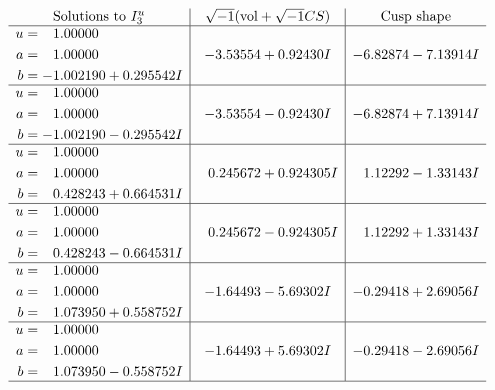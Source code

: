 \documentclass[1p]{elsarticle_modified}
\theoremstyle{definition}
\newcommand{\I}{\sqrt{-1}}
\begin{document}
$$\begin{array}{c|c|c}  
\text{Solutions to }I^u_{3}& \I (\text{vol} + \sqrt{-1}CS) & \text{Cusp shape}\\
 \hline 
\begin{aligned}
u &= \phantom{-}1.00000\phantom{ +0.000000I} \\
a &= \phantom{-}1.00000\phantom{ +0.000000I} \\
b &= -1.002190 + 0.295542 I\end{aligned}
 & -3.53554 + 0.92430 I & -6.82874 - 7.13914 I \\ \hline\begin{aligned}
u &= \phantom{-}1.00000\phantom{ +0.000000I} \\
a &= \phantom{-}1.00000\phantom{ +0.000000I} \\
b &= -1.002190 - 0.295542 I\end{aligned}
 & -3.53554 - 0.92430 I & -6.82874 + 7.13914 I \\ \hline\begin{aligned}
u &= \phantom{-}1.00000\phantom{ +0.000000I} \\
a &= \phantom{-}1.00000\phantom{ +0.000000I} \\
b &= \phantom{-}0.428243 + 0.664531 I\end{aligned}
 & \phantom{-}0.245672 + 0.924305 I & \phantom{-}1.12292 - 1.33143 I \\ \hline\begin{aligned}
u &= \phantom{-}1.00000\phantom{ +0.000000I} \\
a &= \phantom{-}1.00000\phantom{ +0.000000I} \\
b &= \phantom{-}0.428243 - 0.664531 I\end{aligned}
 & \phantom{-}0.245672 - 0.924305 I & \phantom{-}1.12292 + 1.33143 I \\ \hline\begin{aligned}
u &= \phantom{-}1.00000\phantom{ +0.000000I} \\
a &= \phantom{-}1.00000\phantom{ +0.000000I} \\
b &= \phantom{-}1.073950 + 0.558752 I\end{aligned}
 & -1.64493 - 5.69302 I & -0.29418 + 2.69056 I \\ \hline\begin{aligned}
u &= \phantom{-}1.00000\phantom{ +0.000000I} \\
a &= \phantom{-}1.00000\phantom{ +0.000000I} \\
b &= \phantom{-}1.073950 - 0.558752 I\end{aligned}
 & -1.64493 + 5.69302 I & -0.29418 - 2.69056 I\\
 \hline 
 \end{array}$$\newpage\newpage\renewcommand{\arraystretch}{1}
\end{document}
